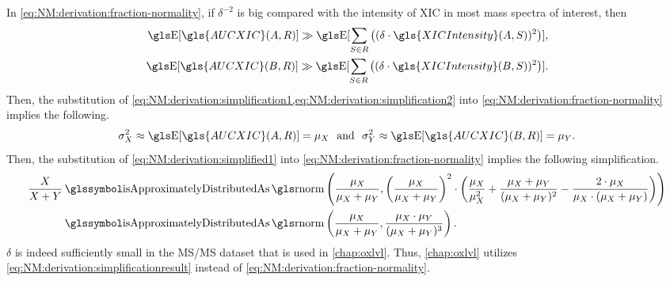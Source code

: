 In \cref{eq:NM:derivation:fraction-normality}, if \(\delta^{-2}\) is big compared with the intensity of \gls{XIC} in most mass spectra of interest, then
\begin{align}
\E[\gls{AUCXIC}(A, R)] \gg \E[\sum_{S\in R}\big((\delta\cdot \gls{XICIntensity}(A,S))^2\big)], \label{eq:NM:derivation:simplification1}\\
\E[\gls{AUCXIC}(B, R)] \gg \E[\sum_{S\in R}\big((\delta\cdot \gls{XICIntensity}(B,S))^2\big)]. \label{eq:NM:derivation:simplification2}
\end{align} 
Then, the substitution of \cref{eq:NM:derivation:simplification1,eq:NM:derivation:simplification2} 
		into \cref{eq:NM:derivation:fraction-normality} implies the following.
\begin{align}
\sigma_X^2 \approx \E[\gls{AUCXIC}(A, R)] = \mu_X \label{eq:NM:derivation:simplified1}
~\text{ and }~
\sigma_Y^2 \approx \E[\gls{AUCXIC}(B, R)] = \mu_Y. %
\end{align}		
Then, the substitution of \cref{eq:NM:derivation:simplified1} into \cref{eq:NM:derivation:fraction-normality} implies the following simplification.
\begin{align}
\frac{X}{X + Y} 
&\isappdistas\rnorm\left(\frac{\mu_X}{\mu_X+\mu_Y}, 
	\left(\frac{\mu_X}{\mu_X+\mu_Y}\right)^2 \cdot 
	\left(\frac{\mu_X}{\mu_X^2} + \frac{\mu_X+\mu_Y}{(\mu_X+\mu_Y)^2} - 
	\frac{2\cdot\mu_X}{\mu_X\cdot(\mu_X+\mu_Y)}\right)
\right)\\
&\isappdistas
\rnorm\left(\frac{\mu_X}{\mu_X+\mu_Y}, 
	\frac{\mu_X\cdot\mu_Y}{(\mu_X+\mu_Y)^3}
\right).
\label{eq:NM:derivation:simplificationresult}	
\end{align}	
\(\delta\) is indeed sufficiently small in the \gls{MS/MS} dataset that is used in \cref{chap:oxlvl}.
Thus, \cref{chap:oxlvl} utilizes \cref{eq:NM:derivation:simplificationresult} instead of \cref{eq:NM:derivation:fraction-normality}.

